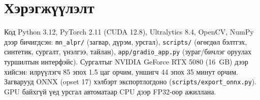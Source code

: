 \section{Хэрэгжүүлэлт}
Код Python 3.12, PyTorch 2.11 (CUDA 12.8), Ultralytics 8.4, OpenCV, NumPy дээр бичигдсэн: \texttt{mn\_alpr/} (загвар, дүрэм, урсгал), \texttt{scripts/} (өгөгдөл бэлтгэх, синтетик, сургалт, үнэлгээ, тайлан), \texttt{app/gradio\_app.py} (зураг/бичлэг оруулах туршилтын интерфэйс). Сургалтыг NVIDIA GeForce RTX 5080 (16~GB) дээр хийсэн: илрүүлэгч 85 эпох 1.5 цаг орчим, уншигч 44 эпох 35 минут орчим. Загварууд ONNX (opset 17) хэлбэрт экспортлогдоно (\texttt{scripts/export\_onnx.py}). GPU байхгүй үед урсгал автоматаар CPU дээр FP32-оор ажиллана.
